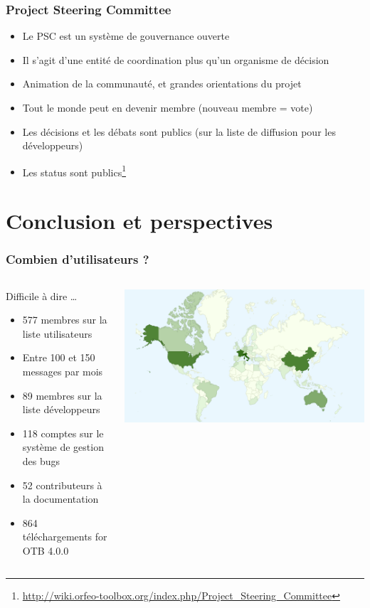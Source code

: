 \documentclass[8pt]{beamer}
\begin{document}
\begin{frame}
\frametitle{Project Steering Committee}
\begin{itemize}
\item Le PSC est un système de gouvernance ouverte
\item Il s'agit d'une entité de coordination plus qu'un organisme de décision
\item Animation de la communauté, et grandes orientations du projet
\item Tout le monde peut en devenir membre (nouveau membre = vote)
\item Les décisions et les débats sont publics (sur la liste de diffusion pour les développeurs)
\item Les status sont publics\footnote{\url{http://wiki.orfeo-toolbox.org/index.php/Project_Steering_Committee}}
\end{itemize}
\end{frame}


\section{Conclusion et perspectives}
\begin{frame}
\frametitle{Combien d'utilisateurs ?}
\begin{columns}[c]
\begin{block}{Difficile à dire \ldots}
\begin{itemize}
    \item 577 membres sur la liste utilisateurs
    \item Entre 100 et 150 messages par mois
    \item 89 membres sur la liste développeurs
    \item 118 comptes sur le système de gestion des bugs
    \item 52 contributeurs à la documentation
    \item 864 téléchargements for OTB 4.0.0
  \end{itemize}
\end{block}
\includegraphics[width=\textwidth]{images/OTB4_download_sourceforge_country_crop.png}
\end{columns}
\end{frame}
\end{document}
